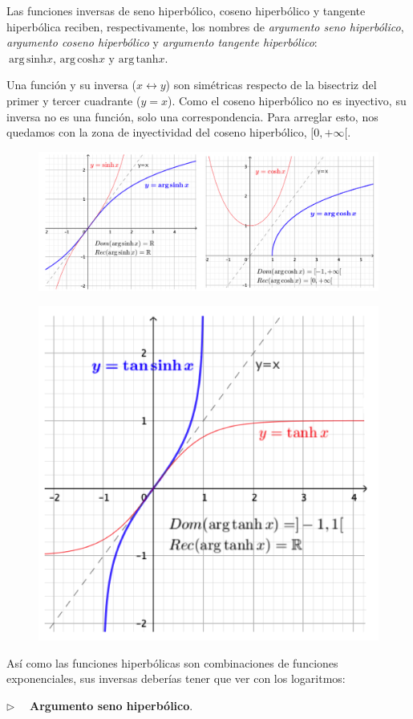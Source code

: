 Las funciones inversas de seno hiperbólico, coseno hiperbólico y tangente hiperbólica reciben, respectivamente, los nombres de \emph{argumento seno hiperbólico}, \emph{argumento coseno hiperbólico} y \emph{argumento tangente hiperbólico}: $\ \mathrm{arg\, sinh} x,\, \mathrm{arg\, cosh} x \text{ y } \mathrm{arg\, tanh} x$.

\textcolor{gris}{Una función y su inversa ($x \leftrightarrow y$) son simétricas respecto de la bisectriz del primer y tercer cuadrante ($y=x$). Como el coseno hiperbólico no es inyectivo, su inversa no es una función, solo una correspondencia. Para arreglar esto, nos quedamos con la zona de inyectividad del coseno hiperbólico, $[0,+\infty[$.}


\begin{figure}[H]
	\centering
	\includegraphics[width=1\textwidth]{img-hiperbol/hiperbol06.png}
	\end{figure}


\begin{figure}[H]
	\centering
	\includegraphics[width=.5\textwidth]{img-hiperbol/hiperbol07.png}
	\end{figure}

Así como las funciones hiperbólicas son combinaciones de funciones exponenciales, sus inversas deberías tener que ver con los logaritmos:

\vspace{5mm}$\triangleright \quad$ \textbf{Argumento seno hiperbólico}.

